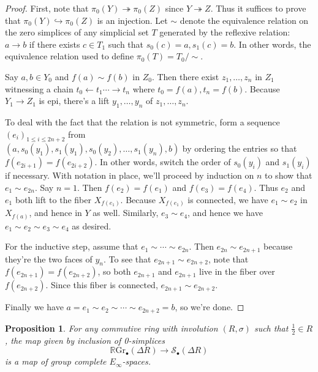 \documentclass[edeposit,fullpage]{uiucthesis2009}
\newcommand{\mc}{\mathcal}
\newcommand{\RGr}{\mathbb R\mathrm{Gr}}
\theoremstyle{plain}
\numberwithin{lemma}{section}
\newtheorem{proposition}[lemma]{Proposition}
\theoremstyle{definition}
\begin{document}
\begin{proof}
First, note that $\pi_0(Y) \twoheadrightarrow \pi_0(Z)$ since $Y
\twoheadrightarrow Z$. Thus it suffices to prove that $\pi_0(Y)
\hookrightarrow \pi_0(Z)$ is an injection. Let $\sim$ denote the
equivalence relation on the zero simplices of any simplicial set $T$
generated by the reflexive relation: $a \rightarrow b$ if there exists $c \in T_1$
such that $s_0(c) = a, s_1(c) = b$. In other words, the equivalence
relation used to define $\pi_0(T) = T_0/\sim$.

Say $a,b \in Y_0$ and $f(a) \sim f(b)$ in $Z_0$. Then there exist
$z_1,\dots,z_n$ in $Z_1$ witnessing a chain $t_0 \leftarrow t_1 \cdots
\rightarrow t_n$ where $t_0 = f(a), t_n = f(b)$. Because $Y_1
\rightarrow Z_1$ is epi, there's a lift $y_1,\dots,y_n$ of
$z_1,\dots,z_n$. 

To deal
with the fact that the relation is not symmetric, form a
sequence $(e_i)_{1 \leq i \leq 2n+2} $ from \\
$(a,s_0(y_1),s_1(y_1),s_0(y_2),\dots,s_1(y_n),b)$ by ordering the entries so that $f(e_{2i+1}) =
f(e_{2i+2})$. In other words, switch the order of $s_0(y_i)$ and
$s_1(y_i)$ if necessary. With notation in place, we'll proceed by
induction on $n$ to show that $e_1 \sim e_{2n}$. Say $n =
1$. Then $f(e_2) = f(e_1)$
and  $f(e_3) = f(e_4)$. Thus $e_2$ and
$e_1$ both lift to the fiber $X_{f(e_1)}$. Because $X_{f(e_1)}$ is
connected, we have $e_1 \sim e_2$ in $X_{f(a)}$, and hence in $Y$
as well. Similarly, $e_3 \sim e_4$, and hence we have $e_1 \sim
e_2 \sim e_3\sim e_4$ as desired. 

For the inductive step, assume that $e_1\sim \cdots \sim e_{2n}$. Then
$e_{2n} \sim e_{2n+1}$ because they're the two faces of $y_n$. To see
that $e_{2n+1}\sim e_{2n+2}$, note that $f(e_{2n+1}) = f(e_{2n+2})$,
so both $e_{2n+1}$ and $e_{2n+1}$ live in the fiber over
$f(e_{2n+2})$. Since this fiber is connected, $e_{2n+1} \sim
e_{2n+2}$.

Finally we have $a = e_1 \sim e_2 \sim \cdots \sim e_{2n+2} = b$, so we're done.
\end{proof}

\begin{proposition}
For any commutive ring with involution $(R,\sigma)$ such that
$\frac{1}{2} \in R$, the map given by inclusion of 0-simplices
\[
\RGr_\bullet(\Delta R) \rightarrow \mc S_\bullet(\Delta R)
\]
is a map of group complete $E_\infty$-spaces.
\end{proposition}
\end{document}
